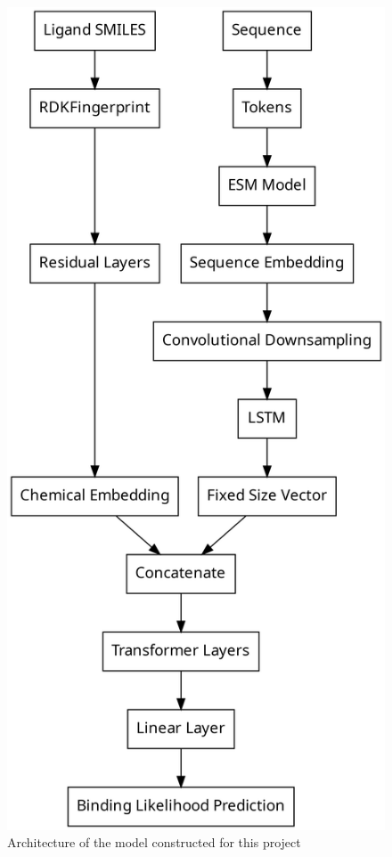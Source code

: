 \documentclass[16pt]{book}
\begin{document}
\begin{figure}
	\begin{center}
	\caption{\label{modelarch} Architecture of the model constructed for this project}
	\includegraphics[height=0.8\textheight]{img/model.png}
	\end{center}
\end{figure}
\end{document}
